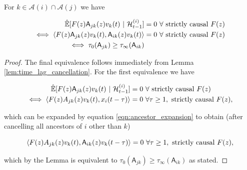 \documentclass[12pt]{article}
\def\A{\mathsf{A}}  %
\def\H{\mathcal{H}}  %
\newcommand{\linE}[2]{\hat{\E}[#1\ |\ #2]}  %
\newcommand{\anc}[1]{\mathcal{A}(#1)}  %
\begin{document}
\begin{corollary}
  \label{cor:time_lag_cancellation}
  For $k \in \anc{i} \cap \anc{j}$ we have

  \begin{align*}
    \linE{F(z)\A_{jk}(z)v_k(t)}{\H_{t - 1}^{(i)}} &= 0\ \forall \text{ strictly causal } F(z)\\
    \iff \inner{F(z)\A_{jk}(z)v_k(t)}{\A_{ik}(z)v_k(t)} &= 0\ \forall \text{ strictly causal } F(z)\\
    \iff \tau_0(\A_{jk}) \ge \tau_\infty(\A_{ik})
  \end{align*}
\end{corollary}
\begin{proof}
  The final equivalence follows immediately from Lemma \ref{lem:time_lag_cancellation}.  For the first equivalence we have

  \begin{align*}
    \linE{F(z)\A_{jk}(z)v_k(t)}{\H_{t - 1}^{(i)}} &= 0\ \forall \text{ strictly causal } F(z)\\
    \iff \inner{F(z)A_{jk}(z)v_k(t)}{x_i(t - \tau)} &= 0\ \forall \tau \ge 1, \text{ strictly causal } F(z),
  \end{align*}

  which can be expanded by equation \eqref{eqn:ancestor_expansion} to
  obtain (after cancelling all ancestors of $i$ other than $k$)

  \begin{equation*}
    \inner{F(z)A_{jk}(z)v_k(t)}{\A_{ik}(z)v_k(t - \tau)} = 0\ \forall \tau \ge 1, \text{ strictly causal } F(z),
  \end{equation*}

  which by the Lemma is equivalent to $\tau_0(\A_{jk}) \ge \tau_\infty(\A_{ik})$ as stated.
\end{proof}
\end{document}
